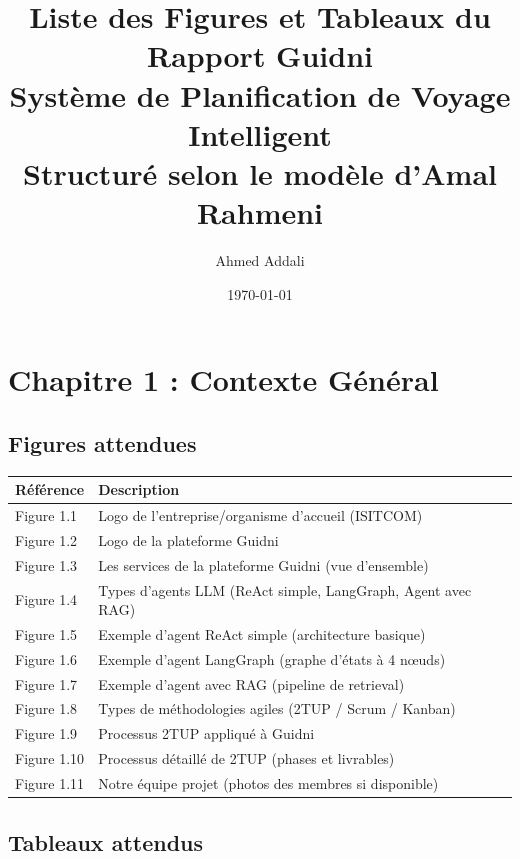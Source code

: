 \documentclass[12pt,a4paper]{article}
\title{Liste des Figures et Tableaux du Rapport Guidni\\
\large Système de Planification de Voyage Intelligent\\
\small Structuré selon le modèle d'Amal Rahmeni}
\author{Ahmed Addali}
\date{\today}
\begin{document}
\maketitle

\tableofcontents

\newpage

\section{Chapitre 1 : Contexte Général}

\subsection*{Figures attendues}

\begin{longtable}{p{2cm} p{12cm}}
    \textbf{Référence} & \textbf{Description} \\
    \midrule
    \endhead
    
    Figure 1.1 & Logo de l'entreprise/organisme d'accueil (ISITCOM) \\
    Figure 1.2 & Logo de la plateforme Guidni \\
    Figure 1.3 & Les services de la plateforme Guidni (vue d'ensemble) \\
    Figure 1.4 & Types d'agents LLM (ReAct simple, LangGraph, Agent avec RAG) \\
    Figure 1.5 & Exemple d'agent ReAct simple (architecture basique) \\
    Figure 1.6 & Exemple d'agent LangGraph (graphe d'états à 4 nœuds) \\
    Figure 1.7 & Exemple d'agent avec RAG (pipeline de retrieval) \\
    Figure 1.8 & Types de méthodologies agiles (2TUP / Scrum / Kanban) \\
    Figure 1.9 & Processus 2TUP appliqué à Guidni \\
    Figure 1.10 & Processus détaillé de 2TUP (phases et livrables) \\
    Figure 1.11 & Notre équipe projet (photos des membres si disponible) \\
    \bottomrule
\end{longtable}

\subsection*{Tableaux attendus}
\end{document}
